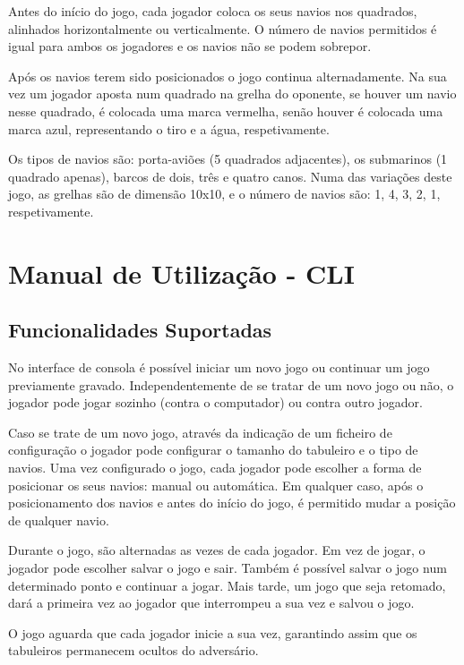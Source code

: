 \documentclass[12pt,a4paper,reqno]{report}
\numberwithin{equation}{section}
\begin{document}
Antes do início do jogo, cada jogador coloca os seus navios nos quadrados, alinhados horizontalmente ou verticalmente. O número de navios permitidos é igual para ambos os jogadores e os navios não se podem sobrepor.

Após os navios terem sido posicionados o jogo continua alternadamente. Na sua vez um jogador aposta num quadrado na grelha do oponente, se houver um navio nesse quadrado, é colocada uma marca vermelha, senão houver é colocada uma marca azul, representando o tiro e a água, respetivamente.

Os tipos de navios são: porta-aviões (5 quadrados adjacentes), os submarinos (1 quadrado apenas), barcos de dois, três e quatro canos. Numa das variações deste jogo, as grelhas são de dimensão 10x10, e o número de navios são: 1, 4, 3, 2, 1, respetivamente.


\chapter{Manual de Utilização - CLI}

\section{Funcionalidades Suportadas}

	No interface de consola é possível iniciar um novo jogo ou continuar um jogo previamente gravado. Independentemente de se tratar de um novo jogo ou não, o jogador pode jogar sozinho (contra o computador) ou contra outro jogador.
	
	Caso se trate de um novo jogo, através da indicação de um ficheiro de configuração o jogador pode configurar o tamanho do tabuleiro e o tipo de navios. Uma vez configurado o jogo, cada jogador pode escolher a forma de posicionar os seus navios: manual ou automática. Em qualquer caso, após o posicionamento dos navios e antes do início do jogo, é permitido mudar a posição de qualquer navio.
	
	Durante o jogo, são alternadas as vezes de cada jogador. Em vez de jogar, o jogador pode escolher salvar o jogo e sair. Também é possível salvar o jogo num determinado ponto e continuar a jogar. Mais tarde, um jogo que seja retomado, dará a primeira vez ao jogador que interrompeu a sua vez e salvou o jogo.

	O jogo aguarda que cada jogador inicie a sua vez, garantindo assim que os tabuleiros permanecem ocultos do adversário.
\end{document}
